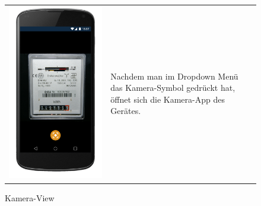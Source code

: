 \begin{figure}[h]
\begin{tabularx}{\textwidth}{X  X}
	\includegraphics[scale = 0.155]{img/AndroidMockup/SystemCamera} \caption{Kamera-View}  & Nachdem man im Dropdown Menü das Kamera-Symbol gedrückt hat, öffnet sich die Kamera-App des Gerätes. \\ 
\end{tabularx}
\end{figure}

